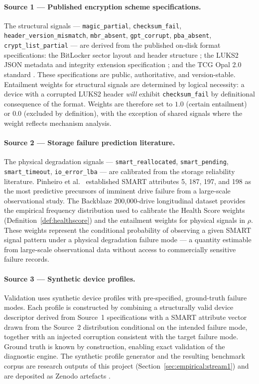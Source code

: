 \documentclass[11pt,a4paper]{report}
\begin{document}
\paragraph{Source 1 --- Published encryption scheme specifications.}
The structural signals --- \texttt{magic\_partial}, \texttt{checksum\_fail}, \texttt{header\_version\_mismatch}, \texttt{mbr\_absent}, \texttt{gpt\_corrupt}, \texttt{pba\_absent}, \texttt{crypt\_list\_partial} --- are derived from the published on-disk format specifications: the BitLocker sector layout and header structure \citep{ferguson2006}; the LUKS2 JSON metadata and integrity extension specification \citep{broz2018}; and the TCG Opal 2.0 standard \citep{tcg2015}. These specifications are public, authoritative, and version-stable. Entailment weights for structural signals are determined by logical necessity: a device with a corrupted LUKS2 header \emph{will} exhibit \texttt{checksum\_fail} by definitional consequence of the format. Weights are therefore set to $1.0$ (certain entailment) or $0.0$ (excluded by definition), with the exception of shared signals where the weight reflects mechanism analysis.

\paragraph{Source 2 --- Storage failure prediction literature.}
The physical degradation signals --- \texttt{smart\_reallocated}, \texttt{smart\_pending}, \texttt{smart\_timeout}, \texttt{io\_error\_lba} --- are calibrated from the storage reliability literature. Pinheiro et al.\ \citep{pinheiro2007} established SMART attributes 5, 187, 197, and 198 as the most predictive precursors of imminent drive failure from a large-scale observational study. The Backblaze 200,000-drive longitudinal dataset \citep{backblaze2024} provides the empirical frequency distribution used to calibrate the Health Score weights (Definition~\ref{def:healthscore}) and the entailment weights for physical signals in $\rho$. These weights represent the conditional probability of observing a given SMART signal pattern under a physical degradation failure mode --- a quantity estimable from large-scale observational data without access to commercially sensitive failure records.

\paragraph{Source 3 --- Synthetic device profiles.}
Validation uses synthetic device profiles with pre-specified, ground-truth failure modes. Each profile is constructed by combining a structurally valid device descriptor derived from Source~1 specifications with a SMART attribute vector drawn from the Source~2 distribution conditional on the intended failure mode, together with an injected corruption consistent with the target failure mode. Ground truth is known by construction, enabling exact validation of the diagnostic engine. The synthetic profile generator and the resulting benchmark corpus are research outputs of this project (Section~\ref{sec:empirical:stream1}) and are deposited as Zenodo artefacts \citep{babatunde2025zenodo}.
\end{document}
